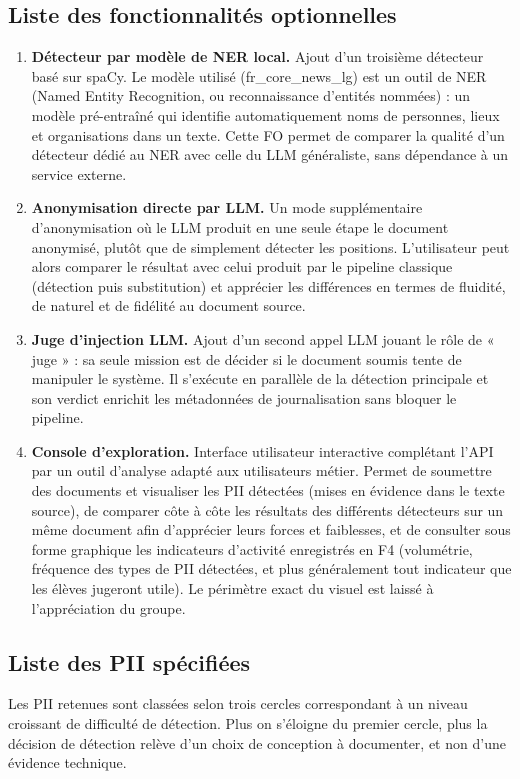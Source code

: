 \documentclass[12pt,a4paper]{article}
\begin{document}
\subsection{Liste des fonctionnalités optionnelles}
\renewcommand{\labelenumi}{FO\arabic{enumi}.}
\begin{enumerate}
  \item \textbf{Détecteur par modèle de NER local.} Ajout d’un troisième détecteur basé sur spaCy. Le modèle utilisé (fr\_core\_news\_lg) est un outil de NER (Named Entity Recognition, ou reconnaissance d’entités nommées) : un modèle pré-entraîné qui identifie automatiquement noms de personnes, lieux et organisations dans un texte. Cette FO permet de comparer la qualité d’un détecteur dédié au NER avec celle du LLM généraliste, sans dépendance à un service externe.
\item \textbf{Anonymisation directe par LLM.} Un mode supplémentaire d’anonymisation où le LLM produit en une seule étape le document anonymisé, plutôt que de simplement détecter les positions. L’utilisateur peut alors comparer le résultat avec celui produit par le pipeline classique (détection puis substitution) et apprécier les différences en termes de fluidité, de naturel et de fidélité au document source.
\item \textbf{Juge d’injection LLM.} Ajout d’un second appel LLM jouant le rôle de « juge » : sa seule mission est de décider si le document soumis tente de manipuler le système. Il s’exécute en parallèle de la détection principale et son verdict enrichit les métadonnées de journalisation sans bloquer le pipeline.
\item \textbf{Console d’exploration.} Interface utilisateur interactive complétant l’API par un outil d’analyse adapté aux utilisateurs métier. Permet de soumettre des documents et visualiser les PII détectées (mises en évidence dans le texte source), de comparer côte à côte les résultats des différents détecteurs sur un même document afin d’apprécier leurs forces et faiblesses, et de consulter sous forme graphique les indicateurs d’activité enregistrés en F4 (volumétrie, fréquence des types de PII détectées, et plus généralement tout indicateur que les élèves jugeront utile). Le périmètre exact du visuel est laissé à l’appréciation du groupe.
\end{enumerate}
\subsection{Liste des PII spécifiées}
Les PII retenues sont classées selon trois cercles correspondant à un niveau
croissant de difficulté de détection. Plus on s'éloigne du premier cercle,
plus la décision de détection relève d'un choix de conception à documenter,
et non d'une évidence technique.
\end{document}
